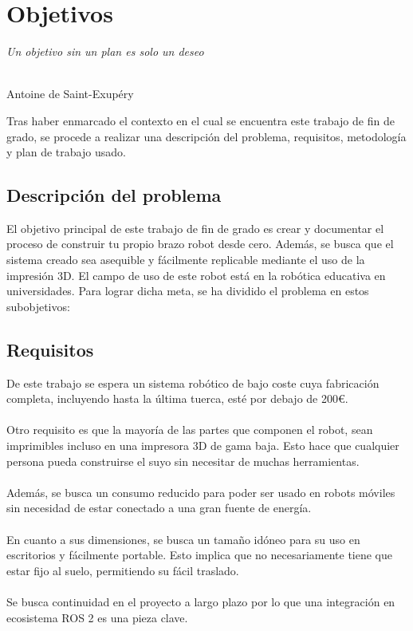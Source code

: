 \chapter{Objetivos}
\label{cap:capitulo2}

\begin{flushright}
\begin{minipage}[]{10cm}
\emph{Un objetivo sin un plan es solo un deseo}\\
\end{minipage}\\

Antoine de Saint-Exupéry\\
\end{flushright}

\vspace{1cm}

Tras haber enmarcado el contexto en el cual se encuentra este trabajo de fin de grado, se procede a realizar
una descripción del problema, requisitos, metodología y plan de trabajo usado.
\section{Descripción del problema}
\label{sec:descripcion}
El objetivo principal de este trabajo de fin de grado es crear y documentar el proceso de construir tu propio brazo robot 
desde cero. Además, se busca que el sistema creado sea asequible y fácilmente replicable mediante el uso de la impresión 3D. El campo 
de uso de este robot está en la robótica educativa en universidades.
Para lograr dicha meta, se ha dividido el problema en estos
subobjetivos:
\section{Requisitos}
\label{sec:requisitos}
De este trabajo se espera un sistema robótico de bajo coste cuya fabricación completa, incluyendo hasta la última tuerca, esté 
por debajo de 200€.\\\\
Otro requisito es que la mayoría de las partes que componen el robot, sean imprimibles incluso en una impresora 3D de gama baja. Esto 
hace que cualquier persona pueda construirse el suyo sin necesitar de muchas herramientas.\\\\
Además, se busca un consumo reducido para poder ser usado en robots móviles sin necesidad de estar conectado a una gran fuente de 
energía.\\\\
En cuanto a sus dimensiones, se busca un tamaño idóneo para su uso en escritorios y fácilmente portable. Esto implica que no necesariamente 
tiene que estar fijo al suelo, permitiendo su fácil traslado.\\\\
Se busca continuidad en el proyecto a largo plazo por lo que una integración en ecosistema ROS 2 es una pieza clave. 

